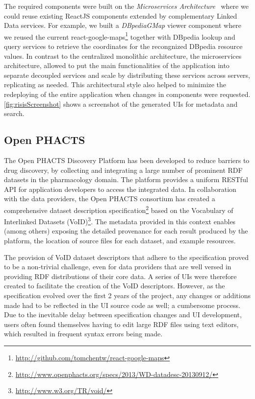 \documentclass{acm_proc_article-sp}
\begin{document}
The required components were built on the \emph{Microservices Architecture}~\cite{microservices} where we could reuse existing ReactJS components extended by complementary Linked Data services.
For example, we built a \emph{DBpediaGMap} viewer component where we reused the current react-google-maps\footnote{\url{http://github.com/tomchentw/react-google-maps}} together with DBpedia lookup and query services to retrieve the coordinates for the recongnized DBpedia resource values.
In contrast to the centralized monolithic architecture, the microservices architecture, allowed to put the main functionalities of the application into separate decoupled services and scale by distributing these services across servers, replicating as needed.
This architectural style also helped to minimize the redeploying of the entire application when changes in components were requested.
\autoref{fig:risisScreenshot} shows a screenshot of the generated UIs for metadata and search.

\subsection{Open PHACTS}

The Open PHACTS Discovery Platform has been developed to reduce barriers to drug discovery, by collecting and integrating a large number of prominent RDF datasets in the pharmacology domain. The platform provides a uniform RESTful API for application developers to access the integrated data.
In collaboration with the data providers, the Open PHACTS consortium has created a comprehensive dataset description specification\footnote{\url{http://www.openphacts.org/specs/2013/WD-datadesc-20130912/}} based on the Vocabulary of Interlinked Datasets (VoID)\footnote{\url{http://www.w3.org/TR/void/}}. The metadata provided in this context enables (among others) exposing the detailed provenance for each result produced by the platform, the location of source files for each dataset, and example resources.

The provision of VoID dataset descriptors that adhere to the specification proved to be a non-trivial challenge, even for data providers that are well versed in providing RDF distributions of their core data. A series of UIs were therefore created to facilitate the creation of the VoID descriptors. However, as the specification evolved over the first 2 years of the project, any changes or additions made had to be reflected in the UI source code as well; a cumbersome process. Due to the inevitable delay between specification changes and UI development, users often found themselves having to edit large RDF files using text editors, which resulted in frequent syntax errors being made.
\end{document}
